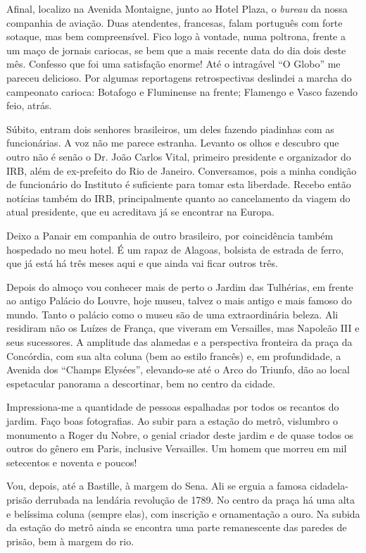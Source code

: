 Afinal, localizo na Avenida Montaigne, junto ao Hotel Plaza, o \textit{bureau} da nossa companhia de aviação. Duas atendentes, francesas, falam português com forte sotaque, mas bem compreensível. Fico logo à vontade, numa poltrona, frente a um maço de jornais cariocas, se bem que a mais recente data do dia dois deste mês. Confesso que foi uma satisfação enorme! Até o intragável ``O Globo'' me pareceu delicioso. Por algumas reportagens retrospectivas deslindei a marcha do campeonato carioca: Botafogo e Fluminense na frente; Flamengo e Vasco fazendo feio, atrás.

Súbito, entram dois senhores brasileiros, um deles fazendo piadinhas com as funcionárias. A voz não me parece estranha. Levanto os olhos e descubro que outro não é senão o Dr. João Carlos Vital, primeiro presidente e organizador do IRB, além de ex-prefeito do Rio de Janeiro. Conversamos, pois a minha condição de funcionário do Instituto é suficiente para tomar esta liberdade. Recebo então notícias também do IRB, principalmente quanto ao cancelamento da viagem do atual presidente, que eu acreditava já se encontrar na Europa.

Deixo a Panair em companhia de outro brasileiro, por coincidência também hospedado no meu hotel. É um rapaz de Alagoas, bolsista de estrada de ferro, que já está há três meses aqui e que ainda vai ficar outros três.

Depois do almoço vou conhecer mais de perto o Jardim das Tulhérias, em frente ao antigo Palácio do Louvre, hoje museu, talvez o mais antigo e mais famoso do mundo. Tanto o palácio como o museu são de uma extraordinária beleza. Ali residiram não os Luízes de França, que viveram em Versailles, mas Napoleão III e seus sucessores. A amplitude das alamedas e a perspectiva fronteira da praça da Concórdia, com sua alta coluna (bem ao estilo francês) e, em profundidade, a Avenida dos ``Champs Elysées'', elevando-se até o Arco do Triunfo, dão ao local espetacular panorama a descortinar, bem no centro da cidade.

Impressiona-me a quantidade de pessoas espalhadas por todos os recantos do jardim. Faço boas fotografias. Ao subir para a estação do metrô, vislumbro o monumento a Roger du Nobre, o genial criador deste jardim e de quase todos os outros do gênero em Paris, inclusive Versailles. Um homem que morreu em mil setecentos e noventa e poucos!

Vou, depois, até a Bastille, à margem do Sena. Ali se erguia a famosa cidadela- prisão derrubada na lendária revolução de 1789. No centro da praça há uma alta e belíssima coluna (sempre elas), com inscrição e ornamentação a ouro. Na subida da estação do metrô ainda se encontra uma parte remanescente das paredes de prisão, bem à margem do rio.

